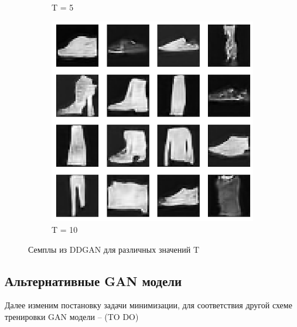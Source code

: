 \documentclass{article}
\begin{document}
\begin{figure}[H]
\begin{subfigure}[h]{0.3\linewidth}
		\caption{T = 5}
	\end{subfigure}
	\hfill
	\begin{subfigure}[h]{0.3\linewidth}
		\centering
		\includegraphics[scale=0.3]{../code/generated_DDGAN_10.png}
		\caption{T = 10}
	\end{subfigure}
	\caption{Семплы из DDGAN для различных значений T}
	
\end{figure}

\subsection{Альтернативные GAN модели}

Далее изменим постановку задачи минимизации, для соответствия другой схеме тренировки GAN модели
 -- (TO DO)






\end{document}
